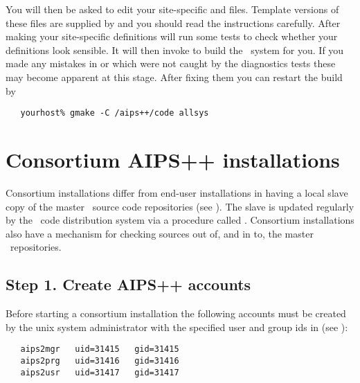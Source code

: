 You will then be asked to edit your site-specific  and
 files.  Template versions of these files are supplied by
 and you should read the instructions carefully.  After
making your site-specific definitions  will run some tests
to check whether your  definitions look sensible.  It will then
invoke  to build the \aipspp\ system for you.  If you made any
mistakes in  or  which were not caught by the
diagnostics tests these may become apparent at this stage.  After fixing them
you can restart the build by

\begin{verbatim}
   yourhost% gmake -C /aips++/code allsys
\end{verbatim}


\section{Consortium AIPS++ installations}
\label{Consortium installation}

Consortium installations differ from end-user installations in having a local
slave copy of the master \rcs\ source code repositories (see
).  The slave is updated regularly by the \aipspp\ code
distribution system via a procedure called .  Consortium
installations also have a mechanism for checking sources out of, and in to,
the master \rcs\ repositories.

\subsection*{Step 1. Create AIPS++ accounts}

Before starting a consortium installation the following accounts must be
created by the unix system administrator with the specified user and group ids
in  (see ):

\begin{verbatim}
   aips2mgr   uid=31415   gid=31415
   aips2prg   uid=31416   gid=31416
   aips2usr   uid=31417   gid=31417
\end{verbatim}

